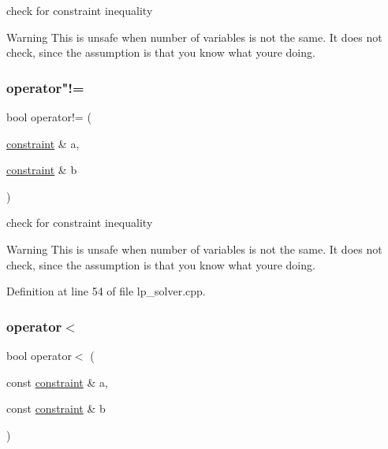check for constraint inequality 

\begin{DoxyWarning}{Warning}
This is unsafe when number of variables is not the same. It does not check, since the assumption is that you know what you\textquotesingle{}re doing. 
\end{DoxyWarning}
\mbox{\label{classconstraint_a75ee7037f652ba94155890c109b88ef8}} 
\subsubsection{\texorpdfstring{operator"!=}{operator!=}\hspace{0.1cm}{\footnotesize\ttfamily [2/2]}}
{\footnotesize\ttfamily bool operator!= (\begin{DoxyParamCaption}\item[{\hyperlink{classconstraint}{constraint} \&}]{a,  }\item[{\hyperlink{classconstraint}{constraint} \&}]{b }\end{DoxyParamCaption})\hspace{0.3cm}{\ttfamily [friend]}}



check for constraint inequality 

\begin{DoxyWarning}{Warning}
This is unsafe when number of variables is not the same. It does not check, since the assumption is that you know what you\textquotesingle{}re doing. 
\end{DoxyWarning}


Definition at line 54 of file lp\+\_\+solver.\+cpp.

\mbox{\label{classconstraint_aecc988c4f28198ecc105f60eddfbfddc}} 
\subsubsection{\texorpdfstring{operator$<$}{operator<}}
{\footnotesize\ttfamily bool operator$<$ (\begin{DoxyParamCaption}\item[{const \hyperlink{classconstraint}{constraint} \&}]{a,  }\item[{const \hyperlink{classconstraint}{constraint} \&}]{b }\end{DoxyParamCaption})\hspace{0.3cm}{\ttfamily [friend]}}




